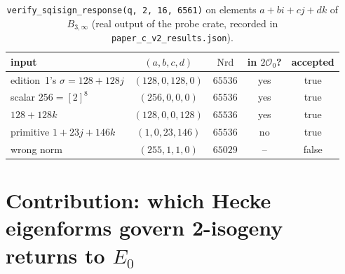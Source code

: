 \documentclass[11pt,a4paper]{article}
\theoremstyle{definition}
\newcommand{\Oz}{\mathcal{O}_0}
\newcommand{\Nrd}{\operatorname{Nrd}}
\begin{document}
\begin{table}[htbp]
\centering
\caption{\texttt{verify\_sqisign\_response(q, 2, 16, 6561)} on elements $a+bi+cj+dk$ of $B_{3,\infty}$ (real output of the probe crate, recorded in \texttt{paper\_c\_v2\_results.json}).}
\label{tab:probe}
\footnotesize
\begin{tabular}{@{}l c c c c@{}}
\toprule
\textbf{input} & $(a,b,c,d)$ & $\Nrd$ & \textbf{in $2\Oz$?} & \textbf{accepted} \\
\midrule
edition~1's $\sigma=128+128j$ & $(128,0,128,0)$ & $65536$ & yes & true \\
scalar $256=[2]^8$ & $(256,0,0,0)$ & $65536$ & yes & true \\
$128+128k$ & $(128,0,0,128)$ & $65536$ & yes & true \\
primitive $1+23j+146k$ & $(1,0,23,146)$ & $65536$ & no & true \\
wrong norm & $(255,1,1,0)$ & $65029$ & -- & false \\
\bottomrule
\end{tabular}
\end{table}

\section{Contribution: which Hecke eigenforms govern 2-isogeny returns to $E_0$}
\label{sec:contribution}
\end{document}
